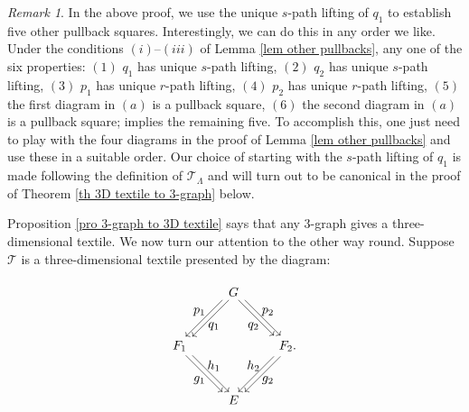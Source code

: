 \documentclass[a4paper,reqno,12pt]{amsart}
\theoremstyle{definition}
\theoremstyle{remark}
\newtheorem{rmk}[thm]{Remark}
\begin{document}
\begin{rmk}\label{rem quivalence of the pullbacks}
In the above proof, we use the unique $s$-path lifting of $q_1$ to establish five other pullback squares. Interestingly, we can do this in any order we like. Under the conditions $(i)$--$(iii)$ of Lemma \ref{lem other pullbacks}, any one of the six properties: $(1)$ $q_1$ has unique $s$-path lifting, $(2)$ $q_2$ has unique $s$-path lifting, $(3)$ $p_1$ has unique $r$-path lifting, $(4)$ $p_2$ has unique $r$-path lifting, $(5)$ the first diagram in $(a)$ is a pullback square, $(6)$ the second diagram in $(a)$ is a pullback square; implies the remaining five. To accomplish this, one just need to play with the four diagrams in the proof of Lemma \ref{lem other pullbacks} and use these in a suitable order. Our choice of starting with the $s$-path lifting of $q_1$ is made following the definition of $\mathcal{T}_\Lambda$ and will turn out to be canonical in the proof of Theorem \ref{th 3D textile to 3-graph} below.  
\end{rmk}
Proposition \ref{pro 3-graph to 3D textile} says that any $3$-graph gives a three-dimensional textile. We now turn our attention to the other way round. Suppose $\mathcal{T}$ is a three-dimensional textile presented by the diagram: 

\[
\begin{tikzpicture}[scale=1]
\node[inner sep=2.5pt, circle] (B) at (-1.5,0) {$F_1$};
\node[inner sep=2.5pt, circle] (C) at (1.5,0) {$F_2$.};	
\node[inner sep=2.5pt, circle] (D) at (0,-1.5) {$E$};
\node[inner sep=2.5pt, circle] (A) at (0,1.5) {$G$}; 

\draw[transform canvas={xshift=0.6ex}, ->] (A) -- (B);
\draw[transform canvas={xshift=-0.6ex}, ->] (A) -- (B);

\draw[transform canvas={xshift=0.6ex}, ->] (A) -- (C);
\draw[transform canvas={xshift=-0.6ex}, ->] (A) -- (C);

\draw[transform canvas={xshift=0.6ex}, ->] (C) -- (D);
\draw[transform canvas={xshift=-0.6ex}, ->] (C) -- (D);

\draw[transform canvas={xshift=0.6ex}, ->] (B) -- (D);
\draw[transform canvas={xshift=-0.6ex}, ->] (B) -- (D);

\node at (-0.55,0.55) {$q_1$};
\node at (-0.95,0.95) {$p_1$};

\node at (0.55,0.55) {$q_2$};
\node at (0.95,0.95) {$p_2$};

\node at (-0.55,-0.55) {$h_1$};
\node at (-0.95,-0.95) {$g_1$};

\node at (0.55,-0.55) {$h_2$};
\node at (0.95,-0.95) {$g_2$};
\end{tikzpicture}
\]
\end{document}
